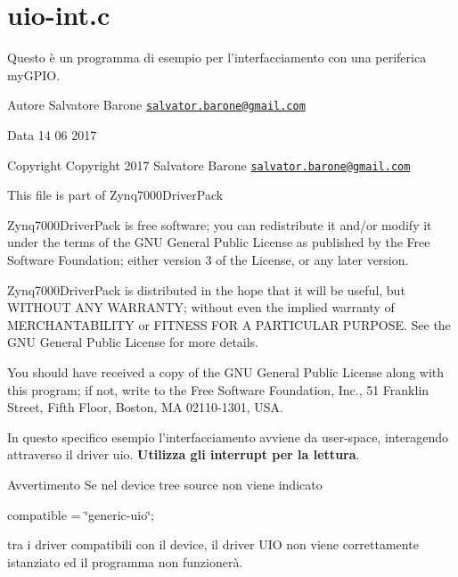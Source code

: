 \hypertarget{uio-int_8c-example}{\section{uio-\/int.\+c}
}
Questo è un programma di esempio per l'interfacciamento con una periferica my\+G\+P\+I\+O.\begin{DoxyAuthor}{Autore}
Salvatore Barone \href{mailto:salvator.barone@gmail.com}{\tt salvator.\+barone@gmail.\+com} 
\end{DoxyAuthor}
\begin{DoxyDate}{Data}
14 06 2017
\end{DoxyDate}
\begin{DoxyCopyright}{Copyright}
Copyright 2017 Salvatore Barone \href{mailto:salvator.barone@gmail.com}{\tt salvator.\+barone@gmail.\+com}
\end{DoxyCopyright}
This file is part of Zynq7000\+Driver\+Pack

Zynq7000\+Driver\+Pack is free software; you can redistribute it and/or modify it under the terms of the G\+N\+U General Public License as published by the Free Software Foundation; either version 3 of the License, or any later version.

Zynq7000\+Driver\+Pack is distributed in the hope that it will be useful, but W\+I\+T\+H\+O\+U\+T A\+N\+Y W\+A\+R\+R\+A\+N\+T\+Y; without even the implied warranty of M\+E\+R\+C\+H\+A\+N\+T\+A\+B\+I\+L\+I\+T\+Y or F\+I\+T\+N\+E\+S\+S F\+O\+R A P\+A\+R\+T\+I\+C\+U\+L\+A\+R P\+U\+R\+P\+O\+S\+E. See the G\+N\+U General Public License for more details.

You should have received a copy of the G\+N\+U General Public License along with this program; if not, write to the Free Software Foundation, Inc., 51 Franklin Street, Fifth Floor, Boston, M\+A 02110-\/1301, U\+S\+A.

In questo specifico esempio l'interfacciamento avviene da user-\/space, interagendo attraverso il driver uio. {\bfseries Utilizza gli interrupt per la lettura}.

\begin{DoxyWarning}{Avvertimento}
Se nel device tree source non viene indicato \begin{center}compatible = \char`\"{}generic-\/uio\char`\"{};\end{center}  tra i driver compatibili con il device, il driver U\+I\+O non viene correttamente istanziato ed il programma non funzionerà.
\end{DoxyWarning}

